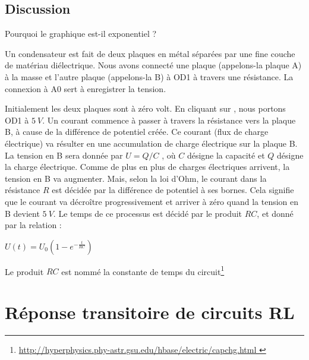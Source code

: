 \documentclass{book}
\begin{document}
\subsection{Discussion}


Pourquoi le graphique est-il exponentiel ?



Un condensateur est fait de deux plaques en métal séparées par une fine couche de matériau diélectrique. Nous avons connecté une plaque (appelons-la plaque A) à la masse et l'autre plaque (appelons-la B) à OD1 à travers une résistance. La connexion à A0 sert à enregistrer la tension.



Initialement les deux plaques sont à zéro volt. En cliquant sur  , nous portons OD1 à $5\ V$. Un courant commence à passer à travers la résistance vers la plaque B, à cause de la différence de potentiel créée. Ce courant (flux de charge électrique) va résulter en une accumulation de charge électrique sur la plaque B. La tension en B sera donnée par $U=Q/C$ , où $C$ désigne la capacité et $Q$ désigne la charge électrique. Comme de plus en plus de charges électriques arrivent, la tension en B va augmenter. Mais, selon la loi d'Ohm, le courant dans la résistance $R$ est décidée par la différence de potentiel à ses bornes. Cela signifie que le courant va décroître progressivement et arriver à zéro quand la tension en B devient $5\ V$. Le temps de ce processus est décidé par le produit $RC$, et donné par la relation :



$U(t)=U_{0}\left(1-e^{-\frac{t}{RC} }\right)$



Le produit $RC$ est nommé la constante de temps du circuit\footnote{\href{http://hyperphysics.phy-astr.gsu.edu/hbase/electric/capchg.html}{\mbox{http://hyperphysics.phy-astr.gsu.edu/hbase/electric/capchg.html}
}
 }









\section{Réponse transitoire de circuits RL}
\end{document}
